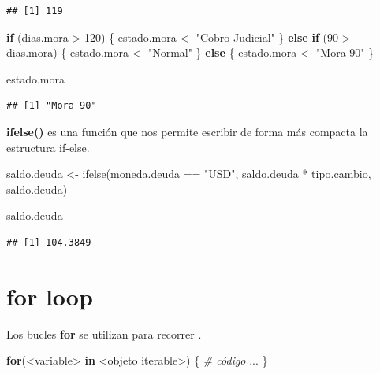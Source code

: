 \documentclass[
  12pt,
]{book}
\newenvironment{Shaded}{\begin{snugshade}}{\end{snugshade}}
\newcommand{\CommentTok}[1]{\textcolor[rgb]{0.56,0.35,0.01}{\textit{#1}}}
\newcommand{\ControlFlowTok}[1]{\textcolor[rgb]{0.13,0.29,0.53}{\textbf{#1}}}
\newcommand{\DecValTok}[1]{\textcolor[rgb]{0.00,0.00,0.81}{#1}}
\newcommand{\FunctionTok}[1]{\textcolor[rgb]{0.00,0.00,0.00}{#1}}
\newcommand{\NormalTok}[1]{#1}
\newcommand{\OtherTok}[1]{\textcolor[rgb]{0.56,0.35,0.01}{#1}}
\newcommand{\SpecialCharTok}[1]{\textcolor[rgb]{0.00,0.00,0.00}{#1}}
\newcommand{\StringTok}[1]{\textcolor[rgb]{0.31,0.60,0.02}{#1}}
\begin{document}
\begin{verbatim}
## [1] 119
\end{verbatim}

\begin{Shaded}
\begin{Highlighting}[]
\ControlFlowTok{if}\NormalTok{ (dias.mora }\SpecialCharTok{\textgreater{}} \DecValTok{120}\NormalTok{) \{}
\NormalTok{  estado.mora }\OtherTok{\textless{}{-}} \StringTok{"Cobro Judicial"}
\NormalTok{\} }\ControlFlowTok{else} \ControlFlowTok{if}\NormalTok{ (}\DecValTok{90} \SpecialCharTok{\textgreater{}}\NormalTok{ dias.mora) \{}
\NormalTok{  estado.mora }\OtherTok{\textless{}{-}} \StringTok{"Normal"}
\NormalTok{\} }\ControlFlowTok{else}\NormalTok{ \{}
\NormalTok{  estado.mora }\OtherTok{\textless{}{-}} \StringTok{"Mora 90"}
\NormalTok{\}}

\NormalTok{estado.mora}
\end{Highlighting}
\end{Shaded}

\begin{verbatim}
## [1] "Mora 90"
\end{verbatim}

\textbf{ifelse()} es una función que nos permite escribir de forma más compacta la estructura if-else.

\begin{Shaded}
\begin{Highlighting}[]
\NormalTok{saldo.deuda }\OtherTok{\textless{}{-}} \FunctionTok{ifelse}\NormalTok{(moneda.deuda }\SpecialCharTok{==} \StringTok{"USD"}\NormalTok{, saldo.deuda }\SpecialCharTok{*}\NormalTok{ tipo.cambio, saldo.deuda)}

\NormalTok{saldo.deuda}
\end{Highlighting}
\end{Shaded}

\begin{verbatim}
## [1] 104.3849
\end{verbatim}

\hypertarget{for-loop}{%
\section{\texorpdfstring{\textbf{for loop}}{for loop}}\label{for-loop}}

Los bucles \textbf{for} se utilizan para recorrer .

\begin{Shaded}
\begin{Highlighting}[]
\ControlFlowTok{for}\NormalTok{(}\SpecialCharTok{\textless{}}\NormalTok{variable}\SpecialCharTok{\textgreater{}} \ControlFlowTok{in} \SpecialCharTok{\textless{}}\NormalTok{objeto iterable}\SpecialCharTok{\textgreater{}}\NormalTok{) \{}
  \CommentTok{\# código}
\NormalTok{  ...}
\NormalTok{\}}
\end{Highlighting}
\end{Shaded}
\end{document}
